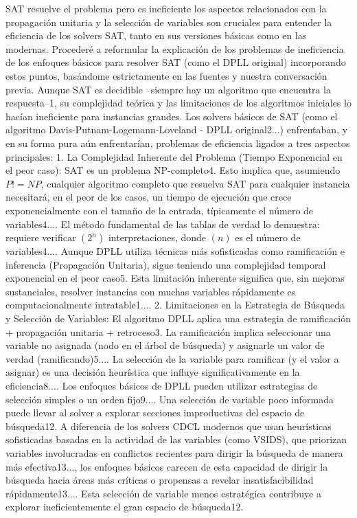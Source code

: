 SAT resuelve el problema pero es ineficiente
los aspectos relacionados con la propagación unitaria y la selección de variables son cruciales para entender la eficiencia de los solvers SAT, tanto en sus versiones básicas como en las modernas. Procederé a reformular la explicación de los problemas de ineficiencia de los enfoques básicos para resolver SAT (como el DPLL original) incorporando estos puntos, basándome estrictamente en las fuentes y nuestra conversación previa.
Aunque SAT es decidible –siempre hay un algoritmo que encuentra la respuesta–1, su complejidad teórica y las limitaciones de los algoritmos iniciales lo hacían ineficiente para instancias grandes. Los solvers básicos de SAT (como el algoritmo Davis-Putnam-Logemann-Loveland - DPLL original2...) enfrentaban, y en su forma pura aún enfrentarían, problemas de eficiencia ligados a tres aspectos principales:
1.
La Complejidad Inherente del Problema (Tiempo Exponencial en el peor caso): SAT es un problema NP-completo4. Esto implica que, asumiendo $P != NP$, cualquier algoritmo completo que resuelva SAT para cualquier instancia necesitará, en el peor de los casos, un tiempo de ejecución que crece exponencialmente con el tamaño de la entrada, típicamente el número de variables4.... El método fundamental de las tablas de verdad lo demuestra: requiere verificar $(2^n)$ interpretaciones, donde $(n)$ es el número de variables4.... Aunque DPLL utiliza técnicas más sofisticadas como ramificación e inferencia (Propagación Unitaria), sigue teniendo una complejidad temporal exponencial en el peor caso5. Esta limitación inherente significa que, sin mejoras sustanciales, resolver instancias con muchas variables rápidamente es computacionalmente intratable1....
2.
Limitaciones en la Estrategia de Búsqueda y Selección de Variables: El algoritmo DPLL aplica una estrategia de ramificación + propagación unitaria + retroceso3. La ramificación implica seleccionar una variable no asignada (nodo en el árbol de búsqueda) y asignarle un valor de verdad (ramificando)5.... La selección de la variable para ramificar (y el valor a asignar) es una decisión heurística que influye significativamente en la eficiencia8.... Los enfoques básicos de DPLL pueden utilizar estrategias de selección simples o un orden fijo9.... Una selección de variable poco informada puede llevar al solver a explorar secciones improductivas del espacio de búsqueda12. A diferencia de los solvers CDCL modernos que usan heurísticas sofisticadas basadas en la actividad de las variables (como VSIDS), que priorizan variables involucradas en conflictos recientes para dirigir la búsqueda de manera más efectiva13..., los enfoques básicos carecen de esta capacidad de dirigir la búsqueda hacia áreas más críticas o propensas a revelar insatisfacibilidad rápidamente13.... Esta selección de variable menos estratégica contribuye a explorar ineficientemente el gran espacio de búsqueda12.

